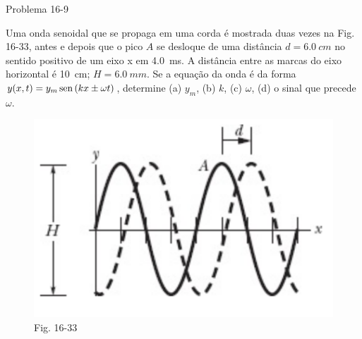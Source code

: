 \begin{frame}{Problema 16-9}
    \begin{minipage}{\textwidth}
        Uma onda senoidal que se propaga em uma corda é mostrada duas vezes na
        Fig. 16-33, antes e depois que o pico \(A\) se desloque de uma distância 
        \(d = \SI{6.0}{cm}\) no sentido positivo de um eixo x em \SI{4,0}{ms}. 
        A distância entre as marcas do eixo horizontal é \SI{10}{cm}; \(H = \SI{6,0}{mm}\). 
        Se a equação da onda é da forma \(y(x,t)=y_m \operatorname{sen}{(kx\pm\omega t)}\),
        determine (a) \(y_m\), (b) \(k\), (c) \(\omega\), (d) o sinal que precede \(\omega\).
    \end{minipage}

    \centering
    \begin{figure}
        \includegraphics[height=0.45\textheight]{images/Captura de tela de 2023-02-02 09-51-11.png}
        \caption{Fig. 16-33}
    \end{figure}
\end{frame}

